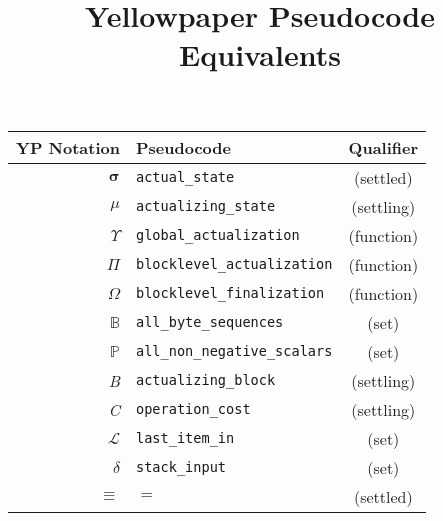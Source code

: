 \documentclass[9pt,a4paper,oneside]{scrartcl}
\author{}
\title{Yellowpaper Pseudocode Equivalents}
\date{}
\begin{document}
\maketitle
\centering
\begin{tabular}{rlc}
	\hline
	\textbf{YP Notation} & \textbf{Pseudocode} & \textbf{Qualifier}\\
	\hline
	$\boldsymbol{\sigma}$ & \texttt{actual\_state} & (settled)  \\
	$\mu$ & \texttt{actualizing\_state} & (settling)  \\
	$\Upsilon$ & \texttt{global\_actualization} & (function) \\
	$\Pi$ & \texttt{blocklevel\_actualization} & (function) \\
	$\Omega$ & \texttt{blocklevel\_finalization} & (function) \\
	$\mathbb{B}$ & \texttt{all\_byte\_sequences} & (set) \\
	$\mathbb{P}$ & \texttt{all\_non\_negative\_scalars} & (set) \\
	\textit{B} & \texttt{actualizing\_block} & (settling) \\
	\textit{C} & \texttt{operation\_cost} & (settling) \\
	$\mathcal{L}$ & \texttt{last\_item\_in} & (set) \\
	$\delta$ & \texttt{stack\_input} & (set) \\
	$\equiv$ & $=$ & (settled) \\

	\hline
\end{tabular}


\printbibliography
\end{document}
